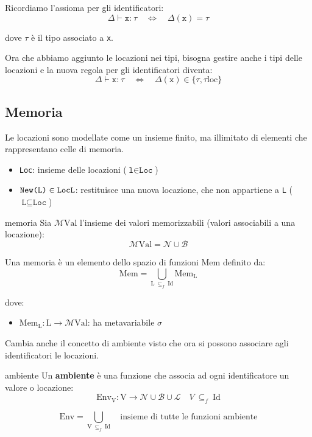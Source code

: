 Ricordiamo l'assioma per gli identificatori:
\[
    \Delta \vdash \texttt{x:} \ \tau \quad \Leftrightarrow \quad \Delta(\texttt{x}) = \tau
\]

dove $\tau$ è il tipo associato a \texttt{x}.

\smallskip
Ora che abbiamo aggiunto le locazioni nei tipi, bisogna gestire anche i tipi delle locazioni e la nuova regola per gli identificatori diventa:
\[
    \Delta \vdash \texttt{x:} \ \tau \quad \Leftrightarrow \quad \Delta(\texttt{x}) \in \{\tau, \tau\mathrm{loc}\}
\]

\subsection{Memoria}
Le locazioni sono modellate come un insieme finito, ma illimitato di elementi che rappresentano celle di memoria.
\begin{itemize}[label=$\triangleright$, itemsep=\smallskipamount]
    \item \texttt{Loc}: insieme delle locazioni ($\texttt{l} \in \texttt{Loc}$)
    \item $\texttt{New(L)} \in \texttt{Loc} \\ \texttt{L}$: restituisce una nuova locazione, che non appartiene a \texttt{L} ($\texttt{L} \subseteq \texttt{Loc}$)
\end{itemize}

\begin{mydef}{memoria}
    Sia $\mathcal{M}\mathrm{Val}$ l'insieme dei valori memorizzabili (valori associabili a una locazione):
    \[
        \mathcal{M}\mathrm{Val} = \mathcal{N} \cup \mathcal{B}
    \]

    \smallskip
    Una memoria è un elemento dello spazio di funzioni $\mathrm{Mem}$ definito da:
    \[
        \mathrm{Mem} = \bigcup\limits_{\mathrm{L} \ \subseteq_f \ \mathrm{Id}} \mathrm{Mem_L}
    \]
\end{mydef}

dove:
\begin{itemize}[label=$\triangleright$, itemsep=\smallskipamount]
    \item $\mathrm{Mem_L : L} \to \mathcal{M}\mathrm{Val}$: ha metavariabile $\sigma$
\end{itemize}

Cambia anche il concetto di ambiente visto che ora si possono associare agli identificatori le locazioni.

\begin{mydef}{ambiente}
    Un \textbf{ambiente} è una funzione che associa ad ogni identificatore un valore o locazione:
    \[
        \mathrm{Env_V} : \mathrm{V} \to \mathcal{N} \cup \mathcal{B} \cup \mathcal{L} \quad V \ \subseteq_f \ \mathrm{Id}
    \]

    \smallskip
    \[
        \mathrm{Env} = \bigcup\limits_{\mathrm{V} \ \subseteq_f \ \mathrm{Id}} \quad \text{insieme di tutte le funzioni ambiente}
    \]
\end{mydef}

